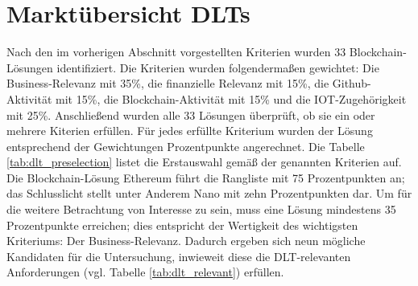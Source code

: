 %
%
\section{Marktübersicht DLTs}
\label{sec:dlt_selection:market}
Nach den im vorherigen Abschnitt vorgestellten Kriterien wurden 33 Blockchain-Lösungen identifiziert. Die Kriterien wurden folgendermaßen gewichtet: Die Business-Relevanz mit 35\%, die finanzielle Relevanz mit 15\%, die Github-Aktivität mit 15\%, die Blockchain-Aktivität mit 15\% und die IOT-Zugehörigkeit mit 25\%. Anschließend wurden alle 33 Lösungen überprüft, ob sie ein oder mehrere Kiterien erfüllen. Für jedes erfüllte Kriterium wurden der Lösung entsprechend der Gewichtungen Prozentpunkte angerechnet. Die Tabelle \ref{tab:dlt_preselection} listet die Erstauswahl gemäß der genannten Kriterien auf.\\
Die Blockchain-Lösung Ethereum führt die Rangliste mit 75 Prozentpunkten an; das Schlusslicht stellt unter Anderem Nano mit zehn Prozentpunkten dar. Um für die weitere Betrachtung von Interesse zu sein, muss eine Lösung mindestens 35 Prozentpunkte erreichen; dies entspricht der Wertigkeit des wichtigsten Kriteriums: Der Business-Relevanz. Dadurch ergeben sich neun mögliche Kandidaten für die Untersuchung, inwieweit diese die \ac{DLT}-relevanten Anforderungen (vgl. Tabelle \ref{tab:dlt_relevant}) erfüllen.

